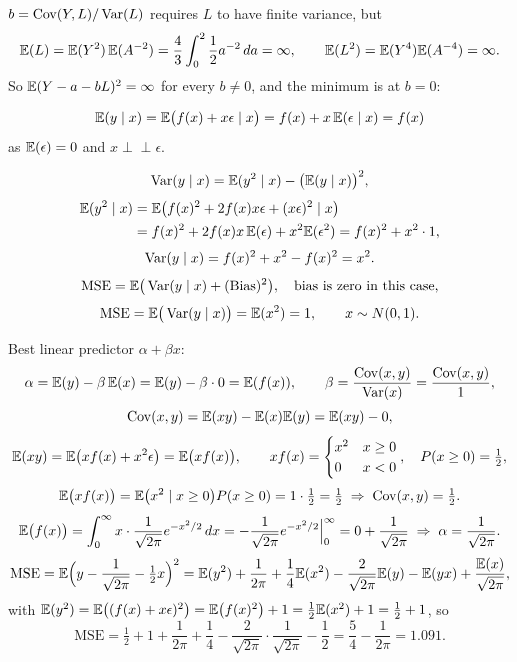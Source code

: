 \documentclass[11pt]{article}
\begin{document}
$b=\operatorname{Cov}(Y,L)/\operatorname{Var}(L)$ requires $L$ to have finite variance, but
\[
\mathbb{E}(L)=\mathbb{E}(Y^2)\,\mathbb{E}(A^{-2})=\frac43\int_0^2\frac12a^{-2}\,da=\infty,\qquad
\mathbb{E}(L^2)=\mathbb{E}(Y^4)\mathbb{E}(A^{-4})=\infty .
\]
So $\mathbb{E}(Y-a-bL)^2=\infty$ for every $b\neq0$, and the minimum is at $b=0$:


\[
\mathbb{E}(y\mid x)=\mathbb{E}\big(f(x)+x\epsilon\mid x\big)=f(x)+x\,\mathbb{E}(\epsilon\mid x)=f(x)
\]
as $\mathbb{E}(\epsilon)=0$ and $x\perp\!\!\!\perp\epsilon$.

\[
\operatorname{Var}(y\mid x)=\mathbb{E}(y^2\mid x)-\big(\mathbb{E}(y\mid x)\big)^2,
\]
\[
\begin{aligned}
\mathbb{E}(y^2\mid x)&=\mathbb{E}\big(f(x)^2+2f(x)x\epsilon+(x\epsilon)^2\mid x\big)\\
&=f(x)^2+2f(x)x\,\mathbb{E}(\epsilon)+x^2\mathbb{E}(\epsilon^2)=f(x)^2+x^2\cdot1,
\end{aligned}
\]
\[
\operatorname{Var}(y\mid x)=f(x)^2+x^2-f(x)^2=x^2 .
\]
\[
\mathrm{MSE}=\mathbb{E}\big(\operatorname{Var}(y\mid x)+(\mathrm{Bias})^2\big),\quad\text{bias is zero in this case,}
\]
\[
\mathrm{MSE}=\mathbb{E}\big(\operatorname{Var}(y\mid x)\big)=\mathbb{E}(x^2)=1,\qquad x\sim N(0,1).
\]

Best linear predictor $\alpha+\beta x$:
\[
\alpha=\mathbb{E}(y)-\beta\,\mathbb{E}(x)=\mathbb{E}(y)-\beta\cdot 0=\mathbb{E}(f(x)),\qquad
\beta=\frac{\operatorname{Cov}(x,y)}{\operatorname{Var}(x)}=\frac{\operatorname{Cov}(x,y)}{1},
\]
\[
\operatorname{Cov}(x,y)=\mathbb{E}(xy)-\mathbb{E}(x)\mathbb{E}(y)=\mathbb{E}(xy)-0,
\]
\[
\mathbb{E}(xy)=\mathbb{E}\big(xf(x)+x^2\epsilon\big)=\mathbb{E}\big(xf(x)\big),\qquad
xf(x)=\begin{cases}x^2 & x\ge0\\ 0 & x<0\end{cases},\quad P(x\ge0)=\tfrac12,
\]
\[
\mathbb{E}\big(xf(x)\big)=\mathbb{E}\big(x^2\mid x\ge0\big)P(x\ge0)=1\cdot\tfrac12=\tfrac12
\;\Rightarrow\;\operatorname{Cov}(x,y)=\tfrac12 .
\]
\[
\mathbb{E}\big(f(x)\big)=\int_0^\infty x\cdot\frac1{\sqrt{2\pi}}e^{-x^2/2}\,dx
=-\frac1{\sqrt{2\pi}}e^{-x^2/2}\Big|_0^\infty=0+\frac1{\sqrt{2\pi}}
\;\Rightarrow\;\alpha=\frac1{\sqrt{2\pi}} .
\]
\[
\mathrm{MSE}=\mathbb{E}\Big(y-\frac1{\sqrt{2\pi}}-\tfrac12x\Big)^2
=\mathbb{E}(y^2)+\frac1{2\pi}+\frac14\mathbb{E}(x^2)-\frac{2}{\sqrt{2\pi}}\mathbb{E}(y)-\mathbb{E}(yx)+\frac{\mathbb{E}(x)}{\sqrt{2\pi}},
\]
with $\mathbb{E}(y^2)=\mathbb{E}\big((f(x)+x\epsilon)^2\big)=\mathbb{E}\big(f(x)^2\big)+1=\tfrac12\mathbb{E}(x^2)+1=\tfrac12+1$, so
\[
\mathrm{MSE}=\tfrac12+1+\frac1{2\pi}+\frac14-\frac2{\sqrt{2\pi}}\cdot\frac1{\sqrt{2\pi}}-\frac12
=\frac54-\frac1{2\pi}=1.091 .
\]
\end{document}
